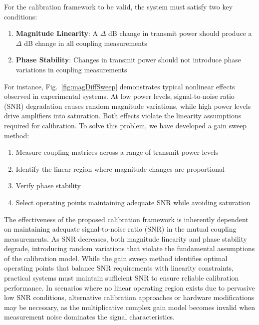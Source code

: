 \documentclass[journal]{IEEEtran}
\begin{document}
For the calibration framework to be valid, the system must satisfy two key conditions:
\begin{enumerate}
    \item \textbf{Magnitude Linearity}: A $\Delta$ dB change in transmit power should produce a $\Delta$ dB change in all coupling measurements
    \item \textbf{Phase Stability}: Changes in transmit power should not introduce phase variations in coupling measurements
\end{enumerate}

For instance, Fig.~\ref{fig:magDiffSweep} demonstrates typical nonlinear effects observed in experimental systems. At low power levels, signal-to-noise ratio (SNR) degradation causes random magnitude variations, while high power levels drive amplifiers into saturation. Both effects violate the linearity assumptions required for calibration. To solve this problem, we have developed a gain sweep method:

\begin{enumerate}
    \item Measure coupling matrices across a range of transmit power levels
    \item Identify the linear region where magnitude changes are proportional 
    \item Verify phase stability
    \item Select operating points maintaining adequate SNR while avoiding saturation
\end{enumerate}

The effectiveness of the proposed calibration framework is inherently dependent on maintaining adequate signal-to-noise ratio (SNR) in the mutual coupling measurements. As SNR decreases, both magnitude linearity and phase stability degrade, introducing random variations that violate the fundamental assumptions of the calibration model. While the gain sweep method identifies optimal operating points that balance SNR requirements with linearity constraints, practical systems must maintain sufficient SNR to ensure reliable calibration performance. In scenarios where no linear operating region exists due to pervasive low SNR conditions, alternative calibration approaches or hardware modifications may be necessary, as the multiplicative complex gain model becomes invalid when measurement noise dominates the signal characteristics.
\end{document}
